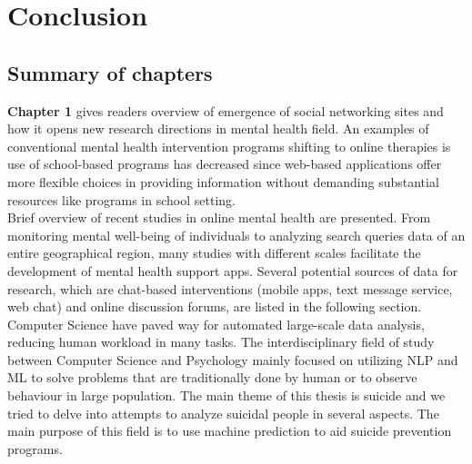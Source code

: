 
\chapter{Conclusion}
	\label{chapter:conclusion}%





\section{Summary of chapters}

\textbf{Chapter 1} gives readers overview of emergence of social networking sites and how it opens new research directions in mental health field. An examples of conventional mental health intervention programs shifting to online therapies is use of school-based programs has decreased since web-based applications offer more flexible choices in providing information without demanding substantial resources like programs in school setting.\\
 Brief overview of recent studies in online mental health are presented. From monitoring mental well-being of individuals to analyzing search queries data of an entire geographical region, many studies with different scales facilitate the development of mental health support apps. Several potential sources of data for research, which are chat-based interventions (mobile apps, text message service, web chat) and online discussion forums, are listed in the following section.\\
Computer Science have paved way for automated large-scale data analysis, reducing human workload in many tasks. The interdisciplinary field of study between Computer Science and Psychology mainly focused on utilizing NLP and ML to solve problems that are traditionally done by human or to observe behaviour in large population. The main theme of this thesis is suicide and we tried to delve into attempts to analyze suicidal people in several aspects. The main purpose of this field is to use machine prediction to aid suicide prevention programs.\\


